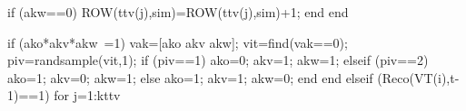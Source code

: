                                                                             if (akw==0)
                                                                                    ROW(ttv(j),sim)=ROW(ttv(j),sim)+1;
                                                                            end
                                                                    end
                                                     
                                                                            if (ako*akv*akw~=1)                                                                
                                                                                     vak=[ako akv akw];
                                                                                     vit=find(vak==0); 
                                                                                     piv=randsample(vit,1);
                                                                                     if (piv==1)
                                                                                            ako=0;
                                                                                            akv=1;
                                                                                            akw=1;
                                                                                     elseif (piv==2)
                                                                                            ako=1;
                                                                                            akv=0;
                                                                                            akw=1;
                                                                                     else 
                                                                                            ako=1;
                                                                                            akv=1;
                                                                                            akw=0;
                                                                                     end                                                                       
                                                                            end
                                                        elseif (Reco(VT(i),t-1)==1)
                                                                        for j=1:kttv                                                                                                  
